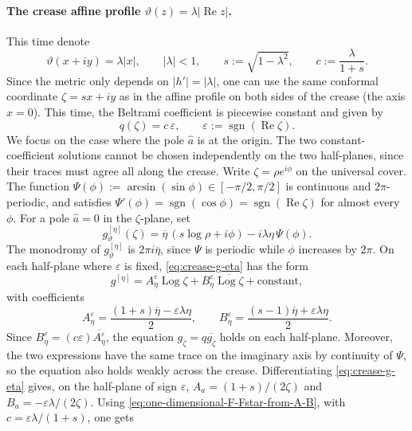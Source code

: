 \documentclass[reqno]{amsart}
\numberwithin{equation}{section}
\theoremstyle{definition}
\theoremstyle{remark}
\renewcommand\Re{\operatorname{Re}}
\providecommand{\Log}{\operatorname{Log}}
\providecommand{\sgn}{\operatorname{sgn}}
\providecommand{\hata}{\widehat a}
\begin{document}
\paragraph{\textbf{The crease affine profile} $\vartheta(z)=\lambda|\Re z|$.} This time denote
\begin{equation}\label{eq:crease-profile}
        \vartheta(x+iy)=\lambda |x|,
        \qquad |\lambda|<1,
        \qquad s:=\sqrt{1-\lambda^2},
        \qquad c:=\frac{\lambda}{1+s}.
\end{equation}
Since the metric only depends on $|h'|=|\lambda|$, one can use the same conformal coordinate $\zeta=sx+iy$ as in the affine profile on both sides of the crease (the axis $x=0$). This time, the Beltrami coefficient is piecewise constant and given by
\begin{equation}\label{eq:crease-q}
        q(\zeta)=c\,\varepsilon,
        \qquad
        \varepsilon:=\sgn(\Re\zeta).
\end{equation}
We focus on the case where the pole $\hata$ is at the origin. The two constant-coefficient solutions cannot be chosen independently on the two half-planes, since their traces must agree all along the crease. Write $\zeta=\rho e^{i\phi}$ on the universal cover. The function $\Psi(\phi):=\arcsin(\sin\phi)\in[-\pi/2,\pi/2]$ is continuous and $2\pi$-periodic, and satisfies $\Psi'(\phi)=\sgn(\cos\phi)=\sgn(\Re\zeta)$ for almost every $\phi$. For a pole $\hata=0$ in the $\zeta$-plane, set
\begin{equation}\label{eq:crease-g-eta}
        g^{[\eta]}_\vartheta(\zeta)
        =\overline\eta\,(s\log\rho+i\phi)
        -i\lambda\eta\,\Psi(\phi).
\end{equation}
The monodromy of $g^{[\eta]}_\vartheta$ is $2\pi i\overline\eta$, since $\Psi$ is periodic while $\phi$ increases by $2\pi$. On each half-plane where $\varepsilon$ is fixed, \eqref{eq:crease-g-eta} has the form
\begin{equation}\label{eq:crease-local-log-form}
        g^{[\eta]}=A^\varepsilon_\eta\Log\zeta+B^\varepsilon_\eta\overline{\Log\zeta}+\mathrm{constant},
\end{equation}
with coefficients
\begin{equation}\label{eq:crease-local-coefficients}
        A^\varepsilon_\eta=\frac{(1+s)\overline\eta-\varepsilon\lambda\eta}{2},
        \qquad
        B^\varepsilon_\eta=\frac{(s-1)\overline\eta+\varepsilon\lambda\eta}{2}.
\end{equation}
Since $B^\varepsilon_\eta=(c\varepsilon)\overline{A^\varepsilon_\eta}$, the equation $g_{\bar\zeta}=q\overline{g_\zeta}$ holds on each half-plane. Moreover, the two expressions have the same trace on the imaginary axis by continuity of $\Psi$, so the equation also holds weakly across the crease. Differentiating \eqref{eq:crease-g-eta} gives, on the half-plane of sign $\varepsilon$, $A_a=(1+s)/(2\zeta)$ and $B_a=-\varepsilon\lambda/(2\zeta)$. Using \eqref{eq:one-dimensional-F-Fstar-from-A-B}, with $c=\varepsilon\lambda/(1+s)$, one gets
\end{document}
